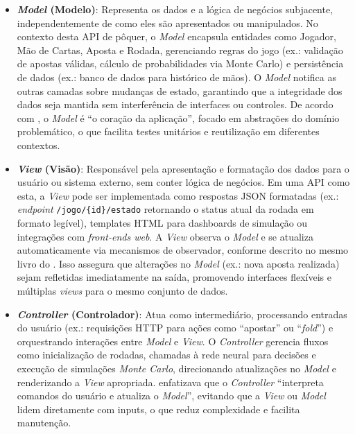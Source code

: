 \begin{itemize}
      \item \textbf{\textit{Model} (Modelo)}: Representa os dados e a lógica de negócios subjacente, independentemente de como eles são apresentados ou manipulados. No contexto desta API de pôquer, o \textit{Model} encapsula entidades como Jogador, Mão de Cartas, Aposta e Rodada, gerenciando regras do jogo (ex.: validação de apostas válidas, cálculo de probabilidades via Monte Carlo) e persistência de dados (ex.: banco de dados para histórico de mãos). O \textit{Model} notifica as outras camadas sobre mudanças de estado, garantindo que a integridade dos dados seja mantida sem interferência de interfaces ou controles. De acordo com , o \textit{Model} é ``o coração da aplicação'', focado em abstrações do domínio problemático, o que facilita testes unitários e reutilização em diferentes contextos.

      \item \textbf{\textit{View} (Visão)}: Responsável pela apresentação e formatação dos dados para o usuário ou sistema externo, sem conter lógica de negócios. Em uma \gls{API} como esta, a \textit{View} pode ser implementada como respostas \gls{JSON} formatadas (ex.: \textit{endpoint }\texttt{/jogo/\{id\}/estado} retornando o status atual da rodada em formato legível), templates \gls{HTML} para dashboards de simulação ou integrações com \textit{front-ends web}. A \textit{View} observa o \textit{Model} e se atualiza automaticamente via mecanismos de observador, conforme descrito no mesmo livro do . Isso assegura que alterações no \textit{Model} (ex.: nova aposta realizada) sejam refletidas imediatamente na saída, promovendo interfaces flexíveis e múltiplas \textit{views} para o mesmo conjunto de dados.

      \item \textbf{\textit{Controller} (Controlador)}: Atua como intermediário, processando entradas do usuário (ex.: requisições \gls{HTTP} para ações como ``apostar'' ou ``\textit{fold}'') e orquestrando interações entre \textit{Model} e \textit{View}. O \textit{Controller} gerencia  fluxos como inicialização de rodadas, chamadas à rede neural para decisões e execução de simulações \textit{Monte Carlo}, direcionando atualizações no \textit{Model} e renderizando a \textit{View} apropriada.
             enfatizava que o \textit{Controller} ``interpreta comandos do usuário e atualiza o \textit{Model}'', evitando que a \textit{View} ou \textit{Model} lidem diretamente com inputs, o que reduz complexidade e facilita manutenção.
\end{itemize}

